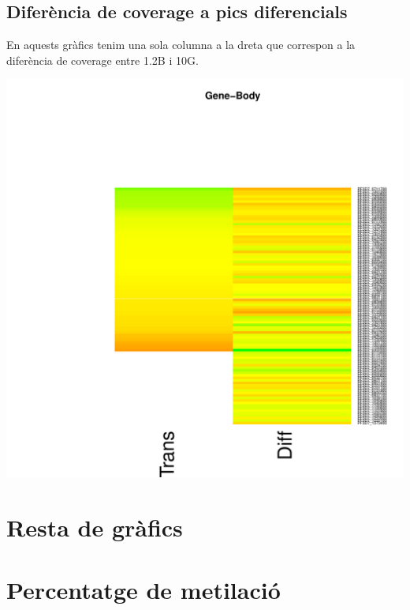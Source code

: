 \documentclass{article}\usepackage[]{graphicx}\usepackage[]{color}
\newenvironment{knitrout}{}{} %
\begin{document}
\subsection{Diferència de coverage a pics diferencials}
En aquests gràfics tenim una sola columna a la dreta que correspon a la diferència de coverage entre 1.2B i 10G.
\begin{knitrout}
\color{fgcolor}

{\centering \includegraphics[width=.9\linewidth]{figure/minimal-heat_difpeak_cov_dif-1} 

}



\end{knitrout}

\clearpage
\section{Resta de gràfics}
\section{Percentatge de metilació}
\end{document}
